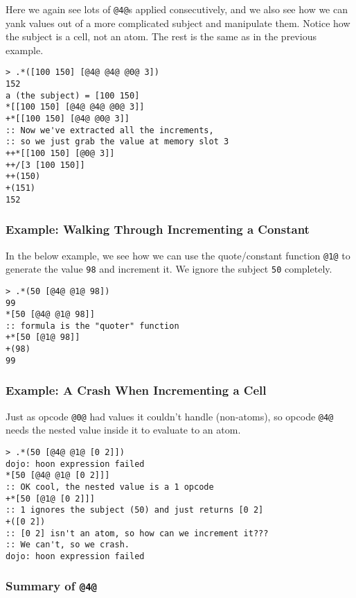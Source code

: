 \documentclass[twoside]{article}
\begin{document}
Here we again see lots of \lstinline[style=inlinecode]{@4@}s applied consecutively, and we also see how we can yank values out of a more complicated subject and manipulate them. Notice how the subject is a cell, not an atom. The rest is the same as in the previous example.

\begin{lstlisting}[style=listingblock]
> .*([100 150] [@4@ @4@ @0@ 3])
152
a (the subject) = [100 150]
*[[100 150] [@4@ @4@ @0@ 3]]
+*[[100 150] [@4@ @0@ 3]]
:: Now we've extracted all the increments,
:: so we just grab the value at memory slot 3
++*[[100 150] [@0@ 3]]
++/[3 [100 150]]
++(150)
+(151)
152
\end{lstlisting}

\subsubsection{Example:  Walking Through Incrementing a Constant}

In the below example, we see how we can use the quote/constant function \lstinline[style=inlinecode]{@1@} to generate the value \lstinline[style=inlinecode]{98} and increment it. We ignore the subject \lstinline[style=inlinecode]{50} completely.

\begin{lstlisting}[style=listingblock]
> .*(50 [@4@ @1@ 98])
99
*[50 [@4@ @1@ 98]]
:: formula is the "quoter" function
+*[50 [@1@ 98]]
+(98)
99
\end{lstlisting}

\subsubsection{Example:  A Crash When Incrementing a Cell}

Just as opcode \lstinline[style=inlinecode]{@0@} had values it couldn't handle (non-atoms), so opcode \lstinline[style=inlinecode]{@4@} needs the nested value inside it to evaluate to an atom.

\begin{lstlisting}[style=listingblock]
> .*(50 [@4@ @1@ [0 2]])
dojo: hoon expression failed
*[50 [@4@ @1@ [0 2]]]
:: OK cool, the nested value is a 1 opcode
+*[50 [@1@ [0 2]]]
:: 1 ignores the subject (50) and just returns [0 2]
+([0 2])
:: [0 2] isn't an atom, so how can we increment it???
:: We can't, so we crash.
dojo: hoon expression failed
\end{lstlisting}

\subsubsection{Summary of \lstinline[style=inlinecode]{@4@}}
\end{document}
